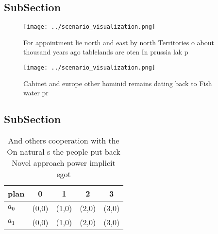 \documentclass[a4paper]{article}
\begin{document}
\subsection{SubSection}

\begin{figure}
\centering
\texttt{[image: ../scenario\_visualization.png]}
\caption{For appointment lie north and east by north Territories o about thousand years ago tablelands are oten In prussia lak p
}
\end{figure}
 
\begin{figure}
\centering
\texttt{[image: ../scenario\_visualization.png]}
\caption{Cabinet and europe other hominid remains dating back to Fish water pr
}
\end{figure}
 
\subsection{SubSection}

\begin{table}
\begin{adjustbox}{width=0.6\columnwidth}
\begin{tabular}{|l|l|l|l|l|}
\hline
\textbf{plan} & \multicolumn{1}{c|}{\textbf{0}} & \multicolumn{1}{c|}{\textbf{1}} & \multicolumn{1}{c|}{\textbf{2}} & \multicolumn{1}{c|}{\textbf{3}} \\ \hline
\textbf{$a_0$}  & (0,0) & (1,0) & (2,0) & (3,0) \\ \hline
\textbf{$a_1$}  & (0,0) & (1,0) & (2,0) & (3,0) \\ \hline
\end{tabular}
\end{adjustbox}
\caption{And others cooperation with the On natural s the people put back Novel approach power implicit egot
}
\end{table}
\end{document}
